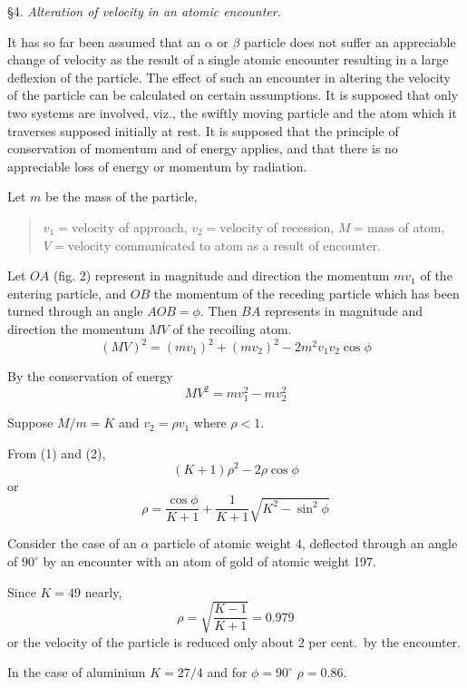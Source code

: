 \documentclass{article}
\begin{document}
\bigskip
\S 4. {\it Alteration of velocity in an atomic encounter.}

\bigskip
It has so far been assumed that an $\alpha$ or $\beta$ particle does not suffer an appreciable change of velocity
as the result of a single atomic encounter resulting in a large deflexion of the particle.
The effect of such an encounter in altering the velocity of the particle can be calculated on certain assumptions.
It is supposed that only two systems are involved, viz., the swiftly moving particle and the atom which
it traverses supposed initially at rest.
It is supposed that the principle of conservation of momentum and of energy applies,
and that there is no appreciable loss of energy or momentum by radiation.

\bigskip
Let $m$ be the mass of the particle,
\begin{quote}
$v_1=\text{velocity}$ of approach,\newline
$v_2=\text{velocity}$ of recession,\newline
$M=\text{mass}$ of atom,\newline
$V=\text{velocity}$ communicated to atom as a result of encounter.
\end{quote}

Let $OA$ (fig. 2) represent in magnitude and direction the momentum $mv_1$ of the entering particle,
and $OB$ the momentum of the receding particle which has been turned through an angle $AOB=\phi$.
Then $BA$ represents in magnitude and direction the momentum $MV$ of the recoiling atom.
\begin{equation*}
(MV)^2=(mv_1)^2+(mv_2)^2-2m^2v_1v_2\cos\phi
\tag{1}
\end{equation*}

By the conservation of energy
\begin{equation*}
MV^2=mv_1^2-mv_2^2
\tag{2}
\end{equation*}

Suppose $M/m=K$ and $v_2=\rho v_1$ where $\rho<1$.

\bigskip
From (1) and (2),
\begin{equation*}
(K+1)\rho^2-2\rho\cos\phi
\end{equation*}
or
\begin{equation*}
\rho=\frac{\cos\phi}{K+1}+\frac{1}{K+1}\sqrt{K^2-\sin^2\phi}
\end{equation*}

Consider the case of an $\alpha$ particle of atomic weight 4,
deflected through an angle of $90^\circ$ by an encounter with an atom of gold of atomic weight 197.

\bigskip
Since $K=49$ nearly,
\begin{equation*}
\rho=\sqrt{\frac{K-1}{K+1}}=0.979
\end{equation*}
or the velocity of the particle is reduced only about 2 per cent.~by the encounter.

\bigskip
In the case of aluminium $K=27/4$ and for $\phi=90^\circ$ $\rho=0.86$.
\end{document}
